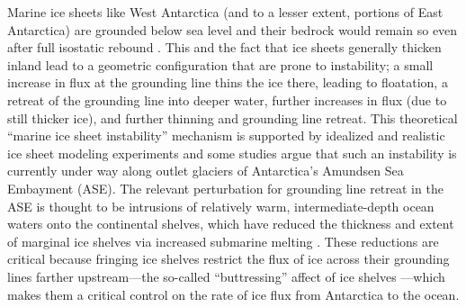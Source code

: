 \documentclass[tc, manuscript]{copernicus}
\begin{document}



\introduction

Marine ice sheets like West Antarctica (and to a lesser extent, portions of East Antarctica) are grounded below sea level and their bedrock would remain so even after full isostatic rebound \citep{barletta2018}. This and the fact that ice sheets generally thicken inland lead to a geometric configuration that are prone to instability; a small increase in flux at the grounding line thins the ice there, leading to floatation, a retreat of the grounding line into deeper water, further increases in flux (due to still thicker ice), and further thinning and grounding line retreat. This theoretical ``marine ice sheet instability'' mechanism \citep{mercer1978, schoof2007} is supported by idealized \citep[e.g.,][]{schoof2012, asay2016} and realistic \citep[e.g.,][]{Cornford2015,royston2016} ice sheet modeling experiments and some studies \citep{joughin2014,rignot2014} argue that such an instability is currently under way along outlet glaciers of Antarctica's Amundsen Sea Embayment (ASE). The relevant perturbation for grounding line retreat in the ASE is thought to be intrusions of relatively warm, intermediate-depth ocean waters onto the continental shelves, which have reduced the thickness and extent of marginal ice shelves via increased submarine melting \citep[e.g.,][]{JenkinsEtAl2016}. These reductions are critical because fringing ice shelves restrict the flux of ice across their grounding lines farther upstream---the so-called ``buttressing'' affect of ice shelves \citep{gudmundsson2012, gudmundsson2013, derydt2015}---which makes them a critical control on the rate of ice flux from Antarctica to the ocean.

\end{document}
